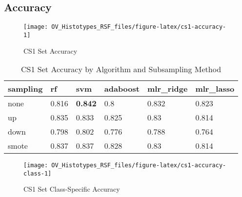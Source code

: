 \documentclass[
]{report}
\begin{document}
\hypertarget{accuracy-1}{%
\subsection{Accuracy}\label{accuracy-1}}

\begin{figure}[H]

{\centering \texttt{[image: OV\_Histotypes\_RSF\_files/figure-latex/cs1-accuracy-1]} 

}

\caption{CS1 Set Accuracy}\label{fig:cs1-accuracy}
\end{figure}

\begin{table}

\caption{\label{tab:cs1-accuracy-table}CS1 Set Accuracy by Algorithm and Subsampling Method}
\centering
\begin{tabular}[t]{l|l|l|l|l|l}
\hline
sampling & rf & svm & adaboost & mlr\_ridge & mlr\_lasso\\
\hline
none & 0.816 & \textbf{0.842} & 0.8 & 0.832 & 0.823\\
\hline
up & 0.835 & 0.833 & 0.825 & 0.83 & 0.814\\
\hline
down & 0.798 & 0.802 & 0.776 & 0.788 & 0.764\\
\hline
smote & 0.837 & 0.837 & 0.828 & 0.83 & 0.814\\
\hline
\end{tabular}
\end{table}

\begin{figure}[H]

{\centering \texttt{[image: OV\_Histotypes\_RSF\_files/figure-latex/cs1-accuracy-class-1]} 

}

\caption{CS1 Set Class-Specific Accuracy}\label{fig:cs1-accuracy-class}
\end{figure}
\end{document}
